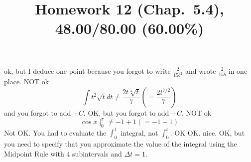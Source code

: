 \documentclass[10pt]{article} %
\title{Homework 12 (Chap.~5.4),
48.00/80.00 (60.00\%)
}
\begin{document}
\maketitle
{}
ok, but I deduce one point because you forgot to write $\frac{2}{15b^2}$ and wrote
$\frac{2}{15b}$ in one place.
NOT ok\begin{equation*}
	\int t^2\sqrt{t}dt\neq \frac{2t\sqrt[3]{t}}{7} \left( =\frac{2t^{7/2}}{7} \right)
\end{equation*}
and you forgot to add $+C$.
OK, but you forgot to add $+C$.
NOT ok
\begin{equation*}
	\cos x\mid^{\pi}_0\neq -1+1 \left( =-1-1 \right)
\end{equation*}
Not OK. You had to evaluate the $\int_0^1$ integral, not $\int_0^t$.
OK
OK. nice.
OK, but you need to specify that you approximate the value of the integral using the Midpoint Rule with 4 subintervals and $\Delta t=1$.
\end{document}
